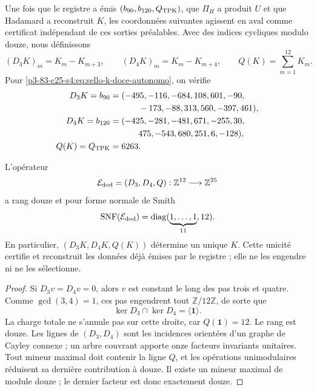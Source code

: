 Une fois que le registre a émis \((b_{90},b_{120},Q_{\rm TPK})\), que
\(\Pi_H\) a produit \(U\) et que Hadamard a reconstruit \(K\), les
coordonnées suivantes agissent en aval comme certificat indépendant de
ces sorties préalables. Avec des indices cycliques modulo douze, nous définissons
\begin{equation}
 (D_3K)_m=K_m-K_{m+3},
 \qquad
 (D_4K)_m=K_m-K_{m+4},
 \qquad
 Q(K)=\sum_{m=1}^{12}K_m.
 \label{p3-83-c25-s4:eq:extractor-diferencias-k}
\end{equation}
Pour \eqref{p3-83-c25-s4:eq:sello-k-doce-autonomo}, on vérifie
\begin{align*}
 D_3K=b_{90}={}&(-495,-116,-684,108,601,-90,\\
         &\qquad-173,-88,313,560,-397,461),\\
 D_4K=b_{120}={}&(-425,-281,-481,671,-255,30,\\
         &\qquad475,-543,680,251,6,-128),\\
 Q(K)=Q_{\rm TPK}={}&6263.
\end{align*}

\begin{theorem}
\label{p3-83-c25-s4:thm:completitud-extractor-transversal-k}
L'opérateur
\[
 \mathcal E_{\rm dod}=(D_3,D_4,Q):
 \mathbb Z^{12}\longrightarrow\mathbb Z^{25}
\]
a rang douze et pour forme normale de Smith
\begin{equation}
 \operatorname{SNF}(\mathcal E_{\rm dod})
 =\operatorname{diag}(\underbrace{1,\ldots,1}_{11},12).
 \label{p3-83-c25-s4:eq:snf-extractor-transversal-k}
\end{equation}
En particulier, \((D_3K,D_4K,Q(K))\) détermine un unique \(K\). Cette
unicité certifie et reconstruit les données déjà émises par le registre ; elle ne les
engendre ni ne les sélectionne.
\end{theorem}

\begin{proof}
Si \(D_3v=D_4v=0\), alors \(v\) est constant le long des pas
trois et quatre. Comme \(\gcd(3,4)=1\), ces pas engendrent tout
\(\mathbb Z/12\mathbb Z\), de sorte que
\[
 \ker D_3\cap\ker D_4=\langle\mathbf1\rangle.
\]
La charge totale ne s’annule pas sur cette droite, car \(Q(\mathbf1)=12\). Le rang
est douze. Les lignes de \((D_3,D_4)\) sont les incidences orientées d’un graphe
de Cayley connexe ; un arbre couvrant apporte onze facteurs invariants
unitaires. Tout mineur maximal doit contenir la ligne \(Q\), et les opérations
unimodulaires réduisent sa dernière contribution à douze. Il existe un mineur maximal de
module douze ; le dernier facteur est donc exactement douze.
\end{proof}

